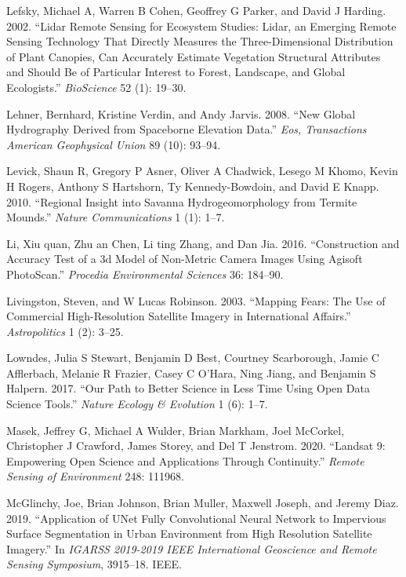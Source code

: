 \documentclass[
  12pt,
]{article}
\newlength{\cslhangindent}
\newlength{\cslentryspacingunit} %
\newenvironment{CSLReferences}[2] %
 {%
  \setlength{\parindent}{0pt}
  \ifodd #1
  \let\oldpar\par
  \def\par{\hangindent=\cslhangindent\oldpar}
  \fi
  \setlength{\parskip}{#2\cslentryspacingunit}
 }%
 {}
\begin{document}
\begin{CSLReferences}{1}{0}
\leavevmode{}%
Lefsky, Michael A, Warren B Cohen, Geoffrey G Parker, and David J
Harding. 2002. {``Lidar Remote Sensing for Ecosystem Studies: Lidar, an
Emerging Remote Sensing Technology That Directly Measures the
Three-Dimensional Distribution of Plant Canopies, Can Accurately
Estimate Vegetation Structural Attributes and Should Be of Particular
Interest to Forest, Landscape, and Global Ecologists.''}
\emph{BioScience} 52 (1): 19--30.

\leavevmode{}%
Lehner, Bernhard, Kristine Verdin, and Andy Jarvis. 2008. {``New Global
Hydrography Derived from Spaceborne Elevation Data.''} \emph{Eos,
Transactions American Geophysical Union} 89 (10): 93--94.

\leavevmode{}%
Levick, Shaun R, Gregory P Asner, Oliver A Chadwick, Lesego M Khomo,
Kevin H Rogers, Anthony S Hartshorn, Ty Kennedy-Bowdoin, and David E
Knapp. 2010. {``Regional Insight into Savanna Hydrogeomorphology from
Termite Mounds.''} \emph{Nature Communications} 1 (1): 1--7.

\leavevmode{}%
Li, Xiu quan, Zhu an Chen, Li ting Zhang, and Dan Jia. 2016.
{``Construction and Accuracy Test of a 3d Model of Non-Metric Camera
Images Using Agisoft PhotoScan.''} \emph{Procedia Environmental
Sciences} 36: 184--90.

\leavevmode{}%
Livingston, Steven, and W Lucas Robinson. 2003. {``Mapping Fears: The
Use of Commercial High-Resolution Satellite Imagery in International
Affairs.''} \emph{Astropolitics} 1 (2): 3--25.

\leavevmode{}%
Lowndes, Julia S Stewart, Benjamin D Best, Courtney Scarborough, Jamie C
Afflerbach, Melanie R Frazier, Casey C O'Hara, Ning Jiang, and Benjamin
S Halpern. 2017. {``Our Path to Better Science in Less Time Using Open
Data Science Tools.''} \emph{Nature Ecology \& Evolution} 1 (6): 1--7.

\leavevmode{}%
Masek, Jeffrey G, Michael A Wulder, Brian Markham, Joel McCorkel,
Christopher J Crawford, James Storey, and Del T Jenstrom. 2020.
{``Landsat 9: Empowering Open Science and Applications Through
Continuity.''} \emph{Remote Sensing of Environment} 248: 111968.

\leavevmode{}%
McGlinchy, Joe, Brian Johnson, Brian Muller, Maxwell Joseph, and Jeremy
Diaz. 2019. {``Application of UNet Fully Convolutional Neural Network to
Impervious Surface Segmentation in Urban Environment from High
Resolution Satellite Imagery.''} In \emph{IGARSS 2019-2019 IEEE
International Geoscience and Remote Sensing Symposium}, 3915--18. IEEE.


\end{CSLReferences}
\end{document}
